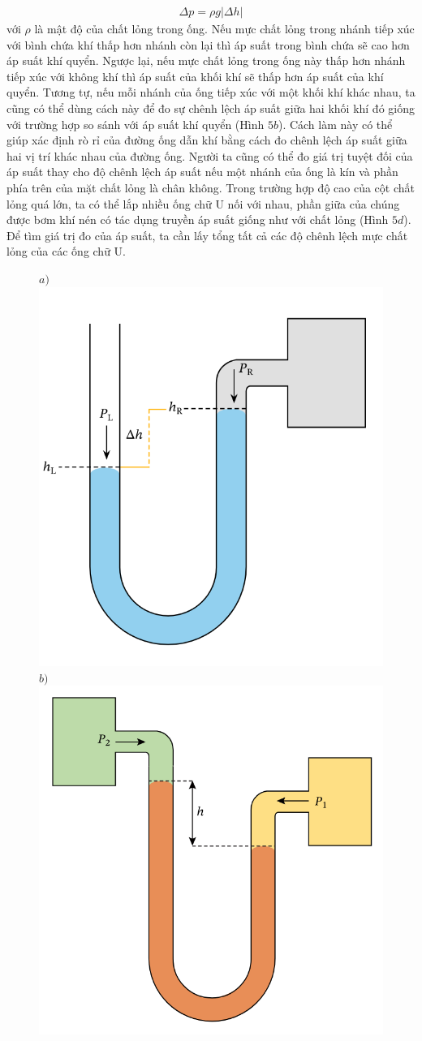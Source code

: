 \begin{multicols}{2}
	\begin{align*}
		\Delta p = \rho g |\Delta h|
	\end{align*}
	với $\rho$ là mật độ của chất lỏng trong ống. 
	\vskip 0.1cm
	Nếu mực chất lỏng trong nhánh tiếp xúc với bình chứa khí thấp hơn nhánh còn lại thì áp suất trong bình chứa sẽ cao hơn áp suất khí quyển. Ngược lại, nếu mực chất lỏng trong ống này thấp hơn nhánh tiếp xúc với không khí thì áp suất của khối khí sẽ thấp hơn áp suất của khí quyển.
	\vskip 0.1cm
	Tương tự, nếu mỗi nhánh của ống tiếp xúc với một khối khí khác nhau, ta cũng có thể dùng cách này để đo sự chênh lệch áp suất giữa hai khối khí đó giống với trường hợp so sánh với áp suất khí quyển (Hình $5b$). Cách làm này có thể giúp xác định rò rỉ của đường ống dẫn khí bằng cách đo chênh lệch áp suất giữa hai vị trí khác nhau của đường ống.
	\vskip 0.1cm
	Người ta cũng có thể đo giá trị tuyệt đối của áp suất thay cho độ chênh lệch áp suất nếu một nhánh của ống là kín và phần phía trên của mặt chất lỏng là chân không. Trong trường hợp độ cao của cột chất lỏng quá lớn, ta có thể lắp nhiều ống chữ U nối với nhau, phần giữa của chúng được bơm khí nén có tác dụng truyền áp suất giống như với chất lỏng (Hình $5d$). Để tìm giá trị đo của áp suất, ta cần lấy tổng tất cả các độ chênh lệch mực chất lỏng của các ống chữ U.
	\begin{figure}[H]
		\vspace*{5pt}
		\centering
		\captionsetup{labelformat= empty, justification=centering}
		$a)$\includegraphics[height = 0.4\linewidth]{6}
		$b)$\includegraphics[height = 0.4\linewidth]{7}
		

\end{figure}
\end{multicols}

